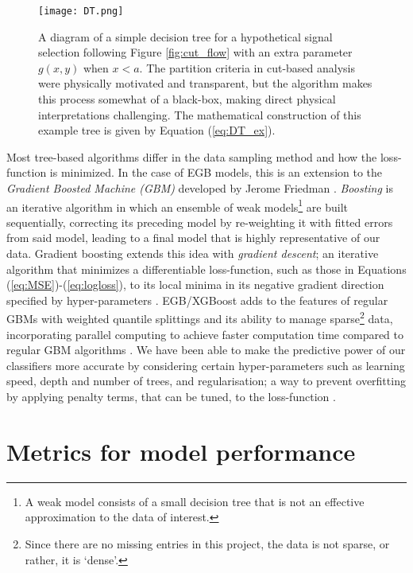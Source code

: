 \begin{figure}[htbp]
    \centering
    \texttt{[image: DT.png]}
    \caption{A diagram of a simple decision tree for a hypothetical signal selection following Figure \ref{fig:cut_flow} with an extra parameter $g(x,y)$ when $x<a$. The partition criteria in cut-based analysis were physically motivated and transparent, but the algorithm makes this process somewhat of a black-box, making direct physical interpretations challenging. The mathematical construction of this example tree is given by Equation (\ref{eq:DT_ex}).}
    \label{fig:tree}
\end{figure}

Most tree-based algorithms differ in the data sampling method and how the loss-function is minimized. In the case of EGB models, this is an extension to the \textit{Gradient Boosted Machine (GBM)} developed by Jerome Friedman \cite{friedman2001greedy}. \textit{Boosting} is an iterative algorithm in which an ensemble of weak models\footnote{A weak model consists of a small decision tree that is not an effective approximation to the data of interest.} are built sequentially, correcting its preceding model by re-weighting it with fitted errors from said model, leading to a final model that is highly representative of our data. Gradient boosting extends this idea with \textit{gradient descent}; an iterative algorithm that minimizes a differentiable loss-function, such as those in Equations (\ref{eq:MSE})-(\ref{eq:logloss}), to its local minima in its negative gradient direction specified by hyper-parameters \cite{gbmKaggle}. EGB/XGBoost adds to the features of regular GBMs with weighted quantile splittings and its ability to manage sparse\footnote{Since there are no missing entries in this project, the data is not sparse, or rather, it is `dense'.} data, incorporating parallel computing to achieve faster computation time compared to regular GBM algorithms \cite{chen2016xgboost}. We have been able to make the predictive power of our classifiers more accurate by considering certain hyper-parameters such as learning speed, depth and number of trees, and regularisation; a way to prevent overfitting by applying penalty terms, that can be tuned, to the loss-function  \cite{james2013introduction}. \\
\section{Metrics for model performance}
\label{sec:metrics}
